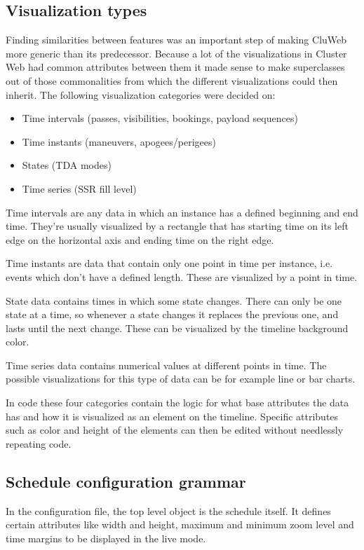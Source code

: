 \subsection{Visualization types}  \label{vis_types}
Finding similarities between features was an important step of making CluWeb more generic than its predecessor. Because a lot of the visualizations in Cluster Web had common attributes between them it made sense to make superclasses out of those commonalities from which the different visualizations could then inherit. The following visualization categories were decided on:

\begin{itemize}
\item Time intervals (passes, visibilities, bookings, payload sequences)
\item Time instants (maneuvers, apogees/perigees)
\item States (TDA modes)
\item Time series (SSR fill level)
\end{itemize}

Time intervals are any data in which an instance has a defined beginning and end time. They're usually visualized by a rectangle that has starting time on its left edge on the horizontal axis and ending time on the right edge.

Time instants are data that contain only one point in time per instance, i.e. events which don't have a defined length. These are visualized by a point in time.

State data contains times in which some state changes. There can only be one state at a time, so whenever a state changes it replaces the previous one, and lasts until the next change. These can be visualized by the timeline background color.

Time series data contains numerical values at different points in time. The possible visualizations for this type of data can be for example line or bar charts.

In code these four categories contain the logic for what base attributes the data has and how it is visualized as an element on the timeline. Specific attributes such as color and height of the elements can then be edited without needlessly repeating  code.

\subsection{Schedule configuration grammar}
In the configuration file, the top level object is the schedule itself. It defines certain attributes like width and height, maximum and minimum zoom level and time margins to be displayed in the live mode.

